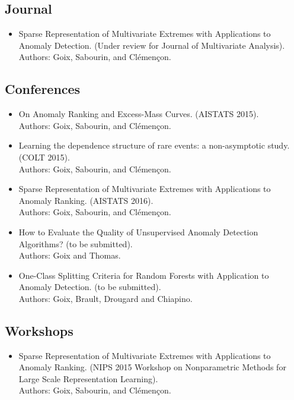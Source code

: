 \begin{listpublis}
%
\small{
\subsection*{Journal}
\begin{itemize}
\item Sparse Representation of Multivariate Extremes with Applications to Anomaly Detection. (Under review for Journal of Multivariate Analysis).\\
Authors: Goix, Sabourin, and Clémençon.
\end{itemize}

\subsection*{Conferences}
\begin{itemize}
\item On Anomaly Ranking and Excess-Mass Curves. (AISTATS 2015).\\
Authors: Goix, Sabourin, and Clémençon. 

\item Learning the dependence structure of rare events: a non-asymptotic study. (COLT 2015).\\
Authors: Goix, Sabourin, and Clémençon.

\item Sparse Representation of Multivariate Extremes with Applications to Anomaly Ranking. (AISTATS 2016).\\
Authors: Goix, Sabourin, and Clémençon.

\item How to Evaluate the Quality of Unsupervised Anomaly Detection Algorithms? (to be submitted).\\ Authors: Goix and Thomas. 

\item One-Class Splitting Criteria for Random Forests with Application to Anomaly Detection. (to be submitted).\\
Authors: Goix, Brault, Drougard and Chiapino.
\end{itemize}


\subsection*{Workshops}
\begin{itemize}
\item Sparse Representation of Multivariate Extremes with Applications to Anomaly Ranking. (NIPS 2015 Workshop on Nonparametric Methods for Large Scale Representation Learning).\\
Authors: Goix, Sabourin, and Clémençon.


\end{itemize}}
\end{listpublis}
